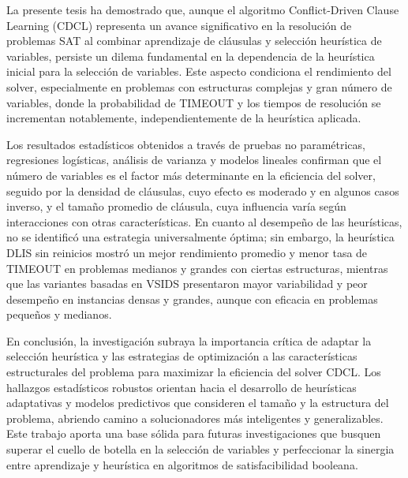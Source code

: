 \begin{conclusions}
La presente tesis ha demostrado que, aunque el algoritmo Conflict-Driven Clause Learning (CDCL) representa un avance significativo en la resolución de problemas SAT al combinar aprendizaje de cláusulas y selección heurística de variables, persiste un dilema fundamental en la dependencia de la heurística inicial para la selección de variables. Este aspecto condiciona el rendimiento del solver, especialmente en problemas con estructuras complejas y gran número de variables, donde la probabilidad de TIMEOUT y los tiempos de resolución se incrementan notablemente, independientemente de la heurística aplicada.

Los resultados estadísticos obtenidos a través de pruebas no paramétricas, regresiones logísticas, análisis de varianza y modelos lineales confirman que el número de variables es el factor más determinante en la eficiencia del solver, seguido por la densidad de cláusulas, cuyo efecto es moderado y en algunos casos inverso, y el tamaño promedio de cláusula, cuya influencia varía según interacciones con otras características. En cuanto al desempeño de las heurísticas, no se identificó una estrategia universalmente óptima; sin embargo, la heurística DLIS sin reinicios mostró un mejor rendimiento promedio y menor tasa de TIMEOUT en problemas medianos y grandes con ciertas estructuras, mientras que las variantes basadas en VSIDS presentaron mayor variabilidad y peor desempeño en instancias densas y grandes, aunque con eficacia en problemas pequeños y medianos.

En conclusión, la investigación subraya la importancia crítica de adaptar la selección heurística y las estrategias de optimización a las características estructurales del problema para maximizar la eficiencia del solver CDCL. Los hallazgos estadísticos robustos orientan hacia el desarrollo de heurísticas adaptativas y modelos predictivos que consideren el tamaño y la estructura del problema, abriendo camino a solucionadores más inteligentes y generalizables. Este trabajo aporta una base sólida para futuras investigaciones que busquen superar el cuello de botella en la selección de variables y perfeccionar la sinergia entre aprendizaje y heurística en algoritmos de satisfacibilidad booleana.

\end{conclusions}
